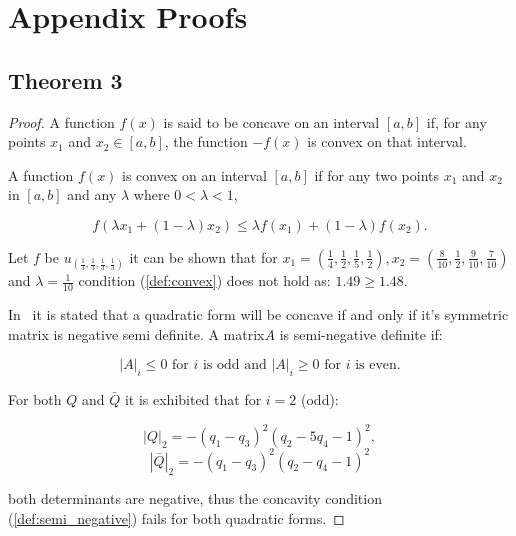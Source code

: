 \section{Appendix Proofs}

\subsection{Theorem 3}

\begin{proof}
    A function \(f(x)\) is said to be concave on an interval \([a, b]\) if, for any
    points \(x_1\) and \(x_2 \in [a, b]\), the function \(-f(x)\) is convex on that
    interval.

    A function \(f(x)\) is convex on an interval \([a, b]\) if for any two
    points \(x_1\) and \(x_2\) in \([a, b]\) and any \(\lambda\) where \(0 < \lambda < 1\),

    \begin{equation}\label{def:convex}
    f (\lambda x_1 + (1 - \lambda )x_2 ) \leq \lambda f (x_1 ) + (1 - \lambda )f (x_2 ).
    \end{equation}

    Let \(f\) be
    \(u_{(\frac{1}{3}, \frac{1}{3}, \frac{1}{3}, \frac{1}{3})}\) it can be shown
    that
    for \(x_1 = (\frac{1}{4}, \frac{1}{2}, \frac{1}{5} , \frac{1}{2}),
    x_2 = (\frac{8}{10}, \frac{1}{2}, \frac{9}{10} , \frac{7}{10})\) and
    \(\lambda=\frac{1}{10}\)
    condition (\ref{def:convex}) does not hold as: \(1.49 \geq 1.48\).

    In~\cite{Anton2014} it is stated that a quadratic form will
    be concave if and only if it's symmetric matrix is negative semi definite.
    A matrix\(A\) is semi-negative definite if:

    \begin{equation}\label{def:semi_negative}
    |A|_i \leq 0 \text{ for } i \text{ is odd and } |A|_i \geq 0  \text{ for } i
    \text{ is even.}
    \end{equation}

    For both \(Q\) and \(\bar{Q}\) it is exhibited that for \(i=2\) (odd):

    \[|Q|_2 = - \left(q_{1} - q_{3}\right)^{2} \left(q_{2} - 5 q_{4} - 1\right)^{2},\]
    \[|\bar{Q}|_2 =- \left(q_{1} - q_{3}\right)^{2} \left(q_{2} - q_{4} - 1\right)^{2}\]

    both determinants are negative, thus the concavity condition
    (\ref{def:semi_negative})
    fails for both quadratic forms.
\end{proof}


